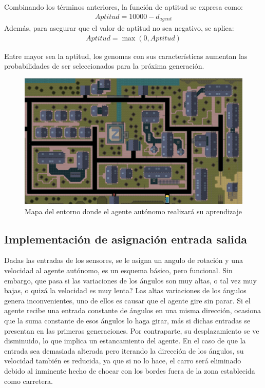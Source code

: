 \documentclass[lettersize, journal]{IEEEtran}
\begin{document}
Combinando los términos anteriores, la función de aptitud se expresa como:
\begin{align*} 
Aptitud = 10000 - d_{agent} 
\end{align*}
Además, para asegurar que el valor de aptitud no sea negativo, se aplica:
\begin{align*} 
Aptitud = \max(0, Aptitud) 
\end{align*}

Entre mayor sea la aptitud, los genomas con sus características aumentan las probabilidades de ser seleccionados para la próxima generación.
\begin{figure}
    \centering
    \includegraphics[scale=0.14]{images/gta2.png}
    \caption{Mapa del entorno donde el agente autónomo realizará su aprendizaje}
    \label{fig:Mapa}
\end{figure} 

\subsection{Implementación de asignación entrada  salida}
Dadas las entradas de los sensores, se le asigna un angulo de rotación y una velocidad al agente autónomo, es un esquema básico, pero funcional. %
Sin embargo, que pasa si las variaciones de los ángulos son muy altas, o tal vez muy bajas, o quizá la velocidad es muy lenta?
Las altas variaciones de los ángulos genera inconvenientes, uno de ellos es causar que el agente gire sin parar. Si el agente recibe una entrada constante de ángulos en una misma dirección, ocasiona que la suma constante de esos ángulos lo haga girar, más si dichas entradas se presentan en las primeras generaciones. Por contraparte, su desplazamiento se ve disminuido, lo que implica un estancamiento del agente. En el caso de que la entrada sea demasiada alterada pero iterando la dirección de los ángulos, su velocidad también es reducida, ya que si no lo hace, el carro será eliminado debido al inminente hecho de chocar con los bordes fuera de la zona establecida como carretera.
\end{document}

